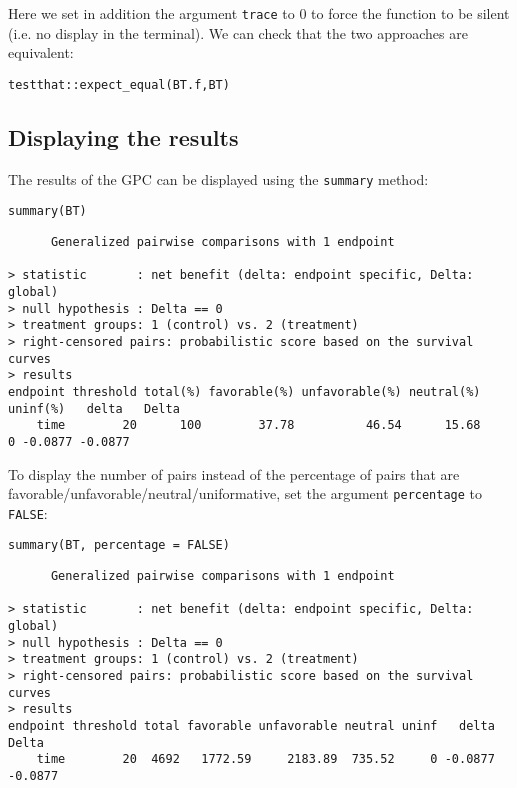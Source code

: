 \documentclass[12pt]{article}
\begin{document}
Here we set in addition the argument \texttt{trace} to 0 to force the
function to be silent (i.e. no display in the terminal). We can check
that the two approaches are equivalent:
\lstset{language=r,label= ,caption= ,captionpos=b,numbers=none}
\begin{lstlisting}
testthat::expect_equal(BT.f,BT)
\end{lstlisting}

\subsection{Displaying the results}
\label{sec:org3c2d7f3}

The results of the GPC can be displayed using the \texttt{summary} method:
\lstset{language=r,label= ,caption= ,captionpos=b,numbers=none}
\begin{lstlisting}
summary(BT)
\end{lstlisting}

\begin{verbatim}
      Generalized pairwise comparisons with 1 endpoint

> statistic       : net benefit (delta: endpoint specific, Delta: global) 
> null hypothesis : Delta == 0 
> treatment groups: 1 (control) vs. 2 (treatment) 
> right-censored pairs: probabilistic score based on the survival curves
> results
endpoint threshold total(%) favorable(%) unfavorable(%) neutral(%) uninf(%)   delta   Delta
    time        20      100        37.78          46.54      15.68        0 -0.0877 -0.0877
\end{verbatim}

 To display the number of pairs instead of the percentage of pairs
that are favorable/unfavorable/neutral/uniformative, set the argument
\texttt{percentage} to \texttt{FALSE}:
\lstset{language=r,label= ,caption= ,captionpos=b,numbers=none}
\begin{lstlisting}
summary(BT, percentage = FALSE)
\end{lstlisting}

\begin{verbatim}
      Generalized pairwise comparisons with 1 endpoint

> statistic       : net benefit (delta: endpoint specific, Delta: global) 
> null hypothesis : Delta == 0 
> treatment groups: 1 (control) vs. 2 (treatment) 
> right-censored pairs: probabilistic score based on the survival curves
> results
endpoint threshold total favorable unfavorable neutral uninf   delta   Delta
    time        20  4692   1772.59     2183.89  735.52     0 -0.0877 -0.0877
\end{verbatim}
\end{document}
